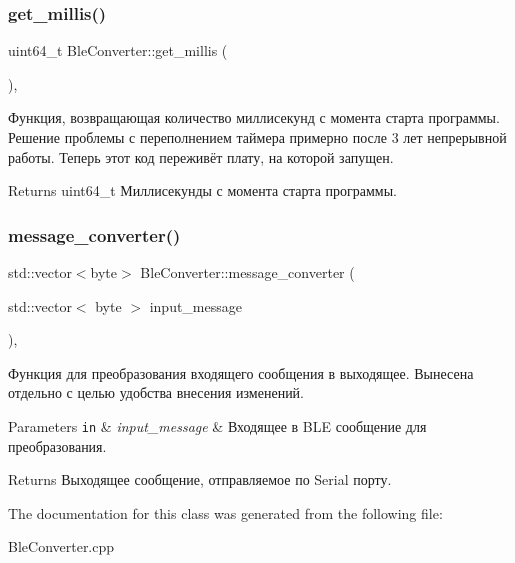 \subsubsection{\texorpdfstring{get\+\_\+millis()}{get\_millis()}}
{\footnotesize\ttfamily uint64\+\_\+t Ble\+Converter\+::get\+\_\+millis (\begin{DoxyParamCaption}{ }\end{DoxyParamCaption})\hspace{0.3cm}{\ttfamily [inline]}, {\ttfamily [protected]}}



Функция, возвращающая количество миллисекунд с момента старта программы.  Решение проблемы с переполнением таймера примерно после 3 лет непрерывной работы. Теперь этот код переживёт плату, на которой запущен. 

\begin{DoxyReturn}{Returns}
uint64\+\_\+t Миллисекунды с момента старта программы. 
\end{DoxyReturn}
\mbox{\label{classBleConverter_a3f14e0e1617f018a63ab32f65cd525a5}} 
\subsubsection{\texorpdfstring{message\+\_\+converter()}{message\_converter()}}
{\footnotesize\ttfamily std\+::vector$<$byte$>$ Ble\+Converter\+::message\+\_\+converter (\begin{DoxyParamCaption}\item[{std\+::vector$<$ byte $>$}]{input\+\_\+message }\end{DoxyParamCaption})\hspace{0.3cm}{\ttfamily [inline]}, {\ttfamily [protected]}}



Функция для преобразования входящего сообщения в выходящее.  Вынесена отдельно с целью удобства внесения изменений. 


\begin{DoxyParams}[1]{Parameters}
\mbox{\tt in}  & {\em input\+\_\+message} & Входящее в B\+LE сообщение для преобразования. \\
\hline
\end{DoxyParams}
\begin{DoxyReturn}{Returns}
Выходящее сообщение, отправляемое по Serial порту. 
\end{DoxyReturn}


The documentation for this class was generated from the following file\+:\begin{DoxyCompactItemize}
\item 
Ble\+Converter.\+cpp\end{DoxyCompactItemize}

